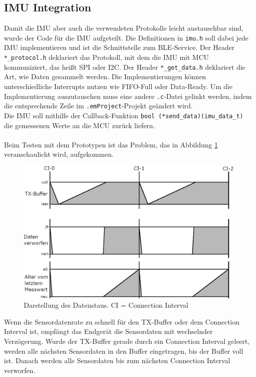 \subsection{IMU Integration}
Damit die IMU aber auch die verwendeten Protokolle leicht austauschbar sind, wurde der Code für die IMU aufgeteilt.
Die Definitionen in \texttt{imu.h} soll dabei jede IMU implementieren und ist die Schnittstelle zum BLE-Service.
Der Header \texttt{*\_protocol.h} deklariert das Protokoll, mit dem die IMU mit MCU kommuniziert, das heißt SPI oder I2C.
Der Header \texttt{*\_get\_data.h} deklariert die Art, wie Daten gesammelt werden.
Die Implementierungen können unterschiedliche Interrupts nutzen wie FIFO-Full oder Data-Ready.
Um die Implementierung auszutauschen muss eine andere \texttt{.c}-Datei gelinkt werden, indem die entsprechende Zeile im \texttt{.emProject}-Projekt geändert wird.\\
Die IMU soll mithilfe der Callback-Funktion \texttt{bool (*send\_data)(imu\_data\_t)} die gemessenen Werte an die MCU zurück liefern.\\\\
Beim Testen mit dem Prototypen ist das Problem, das in Abbildung \ref{fig:daten_vorher} veranschaulicht wird, aufgekommen.
\begin{figure}[!hbtp]
	\centering
	\includegraphics[width=0.76\linewidth]{res/datenVorher.jpg}
	\caption{Darstellung des Datenstaus. CI = Connection Interval}
	\label{fig:daten_vorher}
\end{figure}
Wenn die Sensordatenrate zu schnell für den TX-Buffer oder dem Connection Interval ist, empfängt das Endgerät die Sensordaten mit wechselnder Verzögerung.
Wurde der TX-Buffer gerade durch ein Connection Interval geleert, werden alle nächsten Sensordaten in den Buffer eingetragen, bis der Buffer voll ist.
Danach werden alle Sensordaten bis zum nächsten Connection Interval verworfen.\\
